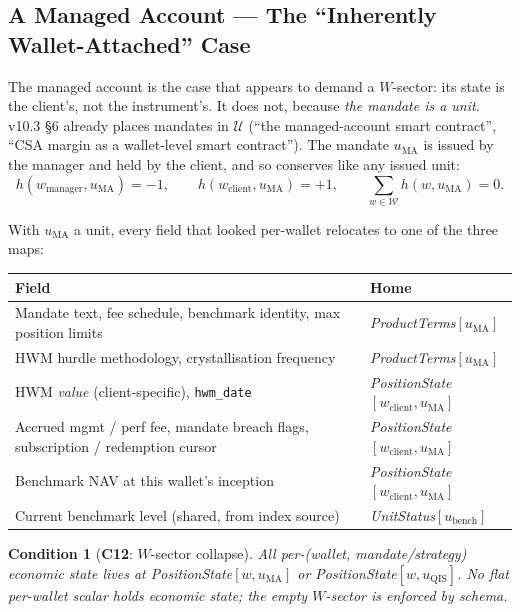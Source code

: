 \documentclass[11pt,a4paper]{article}
\newtheorem{condition}[definition]{Condition}
\begin{document}
\subsection{A Managed Account --- The ``Inherently Wallet-Attached'' Case}
\label{sec:ma}

The managed account is the case that appears to demand a $W$-sector: its state is the
client's, not the instrument's. It does not, because \emph{the mandate is a unit}. v10.3
\S 6 already places mandates in $\mathcal{U}$ (``the managed-account smart contract'', ``CSA
margin as a wallet-level smart contract''). The mandate $u_{\mathrm{MA}}$ is issued by the
manager and held by the client, and so conserves like any issued unit:
\[
h(w_{\mathrm{manager}},u_{\mathrm{MA}}) = -1,\qquad
h(w_{\mathrm{client}},u_{\mathrm{MA}}) = +1,\qquad
\sum_{w\in\mathcal{W}} h(w,u_{\mathrm{MA}}) = 0.
\]

\noindent With $u_{\mathrm{MA}}$ a unit, every field that looked per-wallet relocates to one
of the three maps:

\begin{longtable}{p{8.6cm}p{6.0cm}}
\toprule
\textbf{Field} & \textbf{Home} \\
\midrule
Mandate text, fee schedule, benchmark identity, max position limits &
\emph{ProductTerms}$[u_{\mathrm{MA}}]$ \\
HWM hurdle methodology, crystallisation frequency &
\emph{ProductTerms}$[u_{\mathrm{MA}}]$ \\
HWM \emph{value} (client-specific), \texttt{hwm\_date} &
\emph{PositionState}$[w_{\mathrm{client}},u_{\mathrm{MA}}]$ \\
Accrued mgmt / perf fee, mandate breach flags, subscription / redemption cursor &
\emph{PositionState}$[w_{\mathrm{client}},u_{\mathrm{MA}}]$ \\
Benchmark NAV at this wallet's inception &
\emph{PositionState}$[w_{\mathrm{client}},u_{\mathrm{MA}}]$ \\
Current benchmark level (shared, from index source) &
\emph{UnitStatus}$[u_{\mathrm{bench}}]$ \\
\bottomrule
\end{longtable}

\begin{condition}[\textbf{C12}: $W$-sector collapse]
All per-(wallet, mandate/strategy) economic state lives at
\emph{PositionState}$[w,u_{\mathrm{MA}}]$ or \emph{PositionState}$[w,u_{\mathrm{QIS}}]$.
No flat per-wallet scalar holds economic state; the empty $W$-sector is enforced by schema.
\end{condition}
\end{document}
